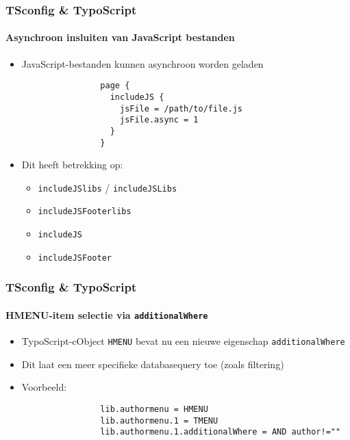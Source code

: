 \begin{frame}[fragile]
	\frametitle{TSconfig \& TypoScript}
	\framesubtitle{Asynchroon insluiten van JavaScript bestanden}

	\begin{itemize}
		\item JavaScript-bestanden kunnen asynchroon worden geladen

			\begin{lstlisting}
				page {
				  includeJS {
				    jsFile = /path/to/file.js
				    jsFile.async = 1
				  }
				}
			\end{lstlisting}

		\item Dit heeft betrekking op:

			\begin{itemize}
				\item \texttt{includeJSlibs} / \texttt{includeJSLibs}
				\item \texttt{includeJSFooterlibs}
				\item \texttt{includeJS}
				\item \texttt{includeJSFooter}
			\end{itemize}

	\end{itemize}

\end{frame}


\begin{frame}[fragile]
	\frametitle{TSconfig \& TypoScript}
	\framesubtitle{HMENU-item selectie via \texttt{additionalWhere}}

	\begin{itemize}

		\item TypoScript-cObject \texttt{HMENU} bevat nu een nieuwe eigenschap \texttt{additionalWhere}
		\item Dit laat een meer specifieke databasequery toe (zoals filtering)

		\item Voorbeeld:

			\begin{lstlisting}
				lib.authormenu = HMENU
				lib.authormenu.1 = TMENU
				lib.authormenu.1.additionalWhere = AND author!=""
			\end{lstlisting}

	\end{itemize}

\end{frame}

